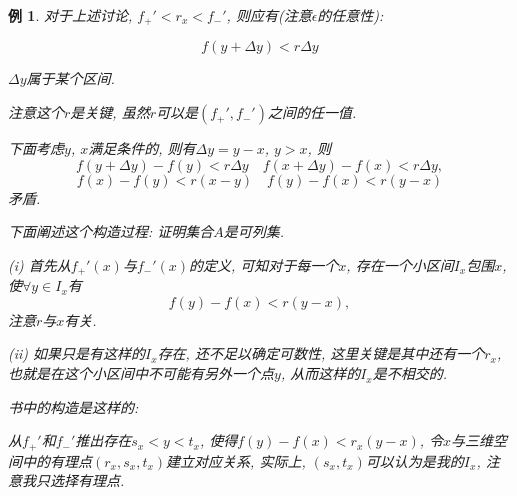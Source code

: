 \documentclass[12pt,a4paper,openany]{book}
\newtheorem{example}{例}
\begin{document}
\begin{example}
对于上述讨论, $f_+' < r_x < f_-'$, 则应有(注意$\epsilon$的任意性):

$$f(y + \Delta{y}) < r\Delta{y}$$ 

$\Delta{y}$属于某个区间.

注意这个$r$是关键, 虽然$r$可以是$(f_+', f_-')$之间的任一值.

下面考虑$y$, $x$满足条件的, 则有$\Delta{y} = y - x$, $y > x$, 则
$$
f(y + \Delta{y}) - f(y) < r\Delta{y} \quad f(x + \Delta{y}) - f(x) < r\Delta{y},
$$
$$
f(x) - f(y) < r(x - y) \quad f(y) - f(x) < r(y - x)
$$
矛盾.

下面阐述这个构造过程: 证明集合$A$是可列集.

(i) 首先从$f_+'(x)$与$f_-'(x)$的定义, 可知对于每一个$x$, 存在一个小区间$I_x$包围$x$, 使$\forall y \in I_x$有
$$
f(y) - f(x) < r(y - x), 
$$
注意$r$与$x$有关.

(ii) 如果只是有这样的$I_x$存在, 还不足以确定可数性, 这里关键是其中还有一个$r_x$, 也就是在这个小区间中不可能有另外一个点$y$, 从而这样的$I_x$是不相交的.

书中的构造是这样的:

从$f_+'$和$f_-'$推出存在$s_x < y < t_x$, 使得$f(y) - f(x) < r_x(y - x)$, 令$x$与三维空间中的有理点$(r_x, s_x, t_x)$建立对应关系, 实际上, $(s_x, t_x)$可以认为是我的$I_x$, 注意我只选择有理点.
\end{example}
\end{document}
